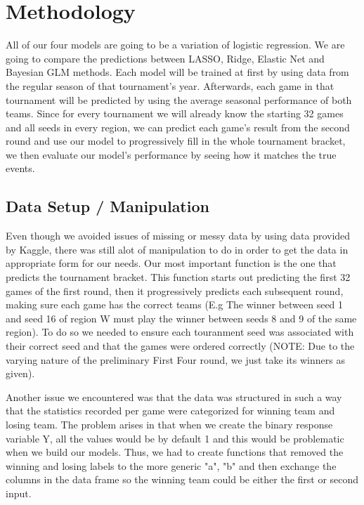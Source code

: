 \documentclass{article} %
\begin{document}
\section{Methodology}
\label{gen_inst}

All of our four models are going to be a variation of logistic regression. We are going to compare the predictions between LASSO, Ridge, Elastic Net and Bayesian GLM methods. Each model will be trained at first by using data from the regular season of that tournament's year. Afterwards, each game in that tournament will be predicted by using the average seasonal performance of both teams. Since for every tournament we will already know the starting 32 games and all seeds in every region, we can predict each game's result from the second round and use our model to progressively fill in the whole tournament bracket, we then evaluate our model's performance by seeing how it matches the true events.

\subsection{Data Setup / Manipulation}

Even though we avoided issues of missing or messy data by using data provided by Kaggle, there was still alot of manipulation to do in order to get the data in appropriate form for our needs. Our most important function is the one that predicts the tournament bracket. This function starts out predicting the first 32 games of the first round, then it progressively predicts each subsequent round, making sure each game has the correct teams (E.g The winner between seed 1 and seed 16 of region W must play the winner between seeds 8 and 9 of the same region). To do so we needed to ensure each touranment seed was associated with their correct seed and that the games were ordered correctly (NOTE: Due to the varying nature of the preliminary First Four round, we just take its winners as given).

Another issue we encountered was that the data was structured in such a way that the statistics recorded per game were categorized for winning team and losing team. The problem arises in that when we create the binary response variable Y, all the values would be by default 1 and this would be problematic when we build our models. Thus, we had to create functions that removed the winning and losing labels to the more generic "a", "b" and then exchange the columns in the data frame so the winning team could be either the first or second input.
\end{document}
